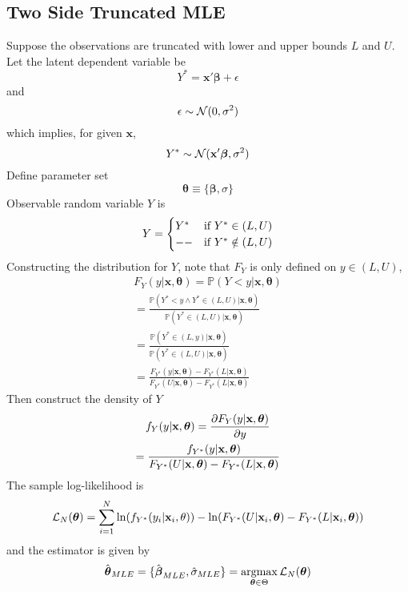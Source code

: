 \documentclass[11pt]{article}
\newcommand{\bm}[1]{\boldsymbol{#1}}
\DeclareMathOperator*{\argmax}{argmax}
\begin{document}
		\subsection{Two Side Truncated MLE}
		\par Suppose the observations are truncated with lower and upper bounds $L$ and $U$. \\
		Let the latent dependent variable be 
		\begin{equation}
			Y^* = \textbf{x}' \bm{\beta} + \epsilon
		\end{equation}
		and 
		\begin{equation}
			\epsilon \sim \mathcal{{N}}(0, \sigma^2)
		\end{equation}
		which implies, for given $\textbf{x}$,
		\begin{equation}
			Y^* \sim \mc{N}(\textbf{x}' \bm{\beta}, \sigma^2)
		\end{equation}
		Define parameter set 
		\begin{equation}
			\bm{\theta} \equiv \{\bm{\beta}, \sigma\}	
		\end{equation}
		Observable random variable $Y$ is 
		\begin{equation}
			Y = \begin{cases}
				Y^* &\text{{if }} Y^* \in (L, U) \\
				-- &\text{{if }} Y^* \notin (L, U)
			\end{cases}
		\end{equation}
		Constructing the distribution for $Y$, note that $F_Y$ is only defined on $y \in (L, U)$,
		\begin{gather}
			F_Y(y|\textbf{x}, \bm{\theta}) = \mathbb{P}(Y<y|\textbf{x}, \bm{\theta})\\
			= \frac{\mathbb{P}(Y^* < y \land Y^* \in (L, U) | \textbf{x}, \bm{\theta})}{\mathbb{P}(Y^* \in (L, U)|\textbf{x}, \bm{\theta})} \\
			= \frac{\mathbb{P}(Y^* \in (L, y)|\textbf{x}, \bm{\theta})}{\mathbb{P}(Y^* \in (L,U)|\textbf{x}, \bm{\theta})} \\
			= \frac{F_{Y^*}(y|\textbf{x}, \bm{\theta}) - F_{Y^*}(L|\textbf{x}, \bm{\theta})}{F_{Y^*}(U|\textbf{x}, \bm{\theta}) - F_{Y^*}(L|\textbf{x}, \bm{\theta})}
		\end{gather}
		Then construct the density of $Y$ 
		\begin{gather}
			f_Y(y|\textbf{x}, \bm{\theta}) = \pd{F_Y(y|\textbf{x}, \bm{\theta})}{y} \\
			= \frac{f_{Y^*}(y|\textbf{x}, \bm{\theta})}{F_{Y^*}(U|\textbf{x}, \bm{\theta}) - F_{Y^*}(L|\textbf{x}, \bm{\theta})}
		\end{gather}
		The sample log-likelihood is
		\begin{gather}
			\mc{L}_N(\bm{\theta}) = \sum_{i=1}^N \ln(f_{Y^*}(y_i|\textbf{x}_i, \theta)) - \ln(F_{Y^*}(U|\textbf{x}_i, \bm{\theta}) - F_{Y^*}(L|\textbf{x}_i, \bm{\theta}))
		\end{gather}
		and the estimator is given by
		\begin{gather}
			\hat{\bm{\theta}}_{MLE} = \{
			\hat{\bm{\beta}}_{MLE}, \hat{\sigma}_{MLE}
			\} = \argmax_{\bm{\theta} \in \Theta} \mc{L}_N(\bm{\theta})
		\end{gather}
\end{document}
